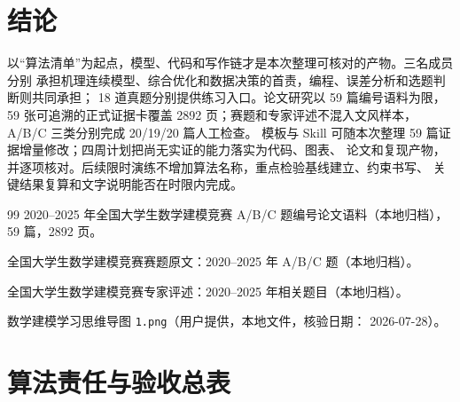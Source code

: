 \documentclass[UTF8,a4paper,12pt]{ctexart}
\begin{document}
\section{结论}

以“算法清单”为起点，模型、代码和写作链才是本次整理可核对的产物。三名成员分别
承担机理连续模型、综合优化和数据决策的首责，编程、误差分析和选题判断则共同承担；
18 道真题分别提供练习入口。论文研究以 59 篇编号语料为限，59 张可追溯的正式证据卡覆盖
2892 页；赛题和专家评述不混入文风样本，A/B/C 三类分别完成 20/19/20 篇人工检查。
模板与 Skill 可随本次整理 59 篇证据增量修改；四周计划把尚无实证的能力落实为代码、图表、
论文和复现产物，并逐项核对。后续限时演练不增加算法名称，重点检验基线建立、约束书写、
关键结果复算和文字说明能否在时限内完成。

\begin{thebibliography}{99}
2020--2025 年全国大学生数学建模竞赛 A/B/C 题编号论文语料（本地归档），
59 篇，2892 页。

全国大学生数学建模竞赛赛题原文：2020--2025 年 A/B/C 题（本地归档）。

全国大学生数学建模竞赛专家评述：2020--2025 年相关题目（本地归档）。

数学建模学习思维导图 \texttt{1.png}（用户提供，本地文件，核验日期：
2026-07-28）。
\end{thebibliography}

\appendix
\section{算法责任与验收总表}
\end{document}
